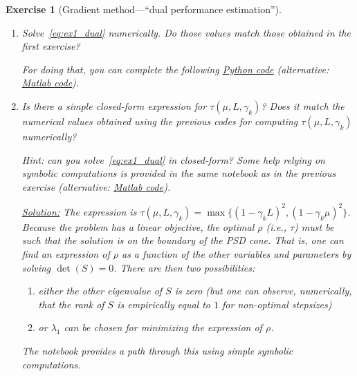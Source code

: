 \documentclass[11pt,a4paper]{article}
\newcommand{\correction}[1]{{{\color{blue}\underline{Solution:} #1}}}
\newcommand{\correction}[1]{}
\newtheorem{exercise}{Exercise}
\begin{document}
\begin{exercise}[Gradient method---``dual performance estimation'']
\begin{enumerate}
An advantage of this approach is that it allows to easily obtain the dual formulations using symbolic computation (see, e.g., \href{https://github.com/PerformanceEstimation/Learning-Performance-Estimation/blob/main/Codes/Jupyter/Exercise02.ipynb}{Python this notebook}, or this \href{https://github.com/PerformanceEstimation/Learning-Performance-Estimation/blob/main/Codes/Matlab/Exercise2_symbolicalLMI.m}{Matlab file}).
		
		\correction{Because all expressions in the Lagrangian are quadratics in $(x_k-x_\star,g_k)$ and linear in $f_k-f_\star$, the gradient and Hessian of the Lagrangian respectively with respect to $f_k$ and to $(x_k,g_k)$ actually corresponds to the matrices $s$ and $S$ such that \[\mathrm{Trace}(-SG)+ s F=\mathcal{L}(x_k,g_k,f_k,x_\star,f_\star;\lambda_1,\lambda_2,\rho),\] where $G$ is the previously defined Gram matrix~\eqref{ex1:eq:GRAM}.}
		
	
	\item Solve~\eqref{eq:ex1_dual} numerically. Do those values match those obtained in the first exercise? 
	
	For doing that, you can complete the following \href{https://github.com/PerformanceEstimation/Learning-Performance-Estimation/tree/main/Codes/Jupyter/Exercise02.ipynb}{Python code} (alternative: \href{https://github.com/PerformanceEstimation/Learning-Performance-Estimation/blob/main/Codes/Matlab/Exercise2.m}{Matlab code}).

	\item Is there a simple closed-form expression for $\tau(\mu,L,\gamma_k)$? Does it match the numerical values obtained using the previous codes for computing $\tau(\mu,L,\gamma_k)$ numerically?
	
	Hint: can you solve~\eqref{eq:ex1_dual}	in closed-form?	Some help relying on symbolic computations is provided in the same notebook as in the previous exercise (alternative: \href{https://github.com/PerformanceEstimation/Learning-Performance-Estimation/blob/main/Codes/Matlab/Exercise2_closedform.m}{Matlab code}).
	
	
	
	\correction{The expression is $\tau(\mu,L,\gamma_k)=\max\{(1-\gamma_k L)^2,(1-\gamma_k\mu)^2\}$. Because the problem has a linear objective, the optimal $\rho$ (i.e., $\tau$) must be such that the solution is on the boundary of the PSD cone. That is, one can find an expression of $\rho$ as a function of the other variables and parameters by solving $\det(S)=0$. There are then two possibilities:
	\begin{enumerate}
	\item either the other eigenvalue of $S$ is zero (but one can observe, numerically, that the rank of $S$ is empirically equal to $1$ for non-optimal stepsizes)
	\item or $\lambda_1$ can be chosen for minimizing the expression of $\rho$.
	\end{enumerate}
The notebook provides a path through this using simple symbolic computations.	
}
	

\end{enumerate}
\end{exercise}
\end{document}

